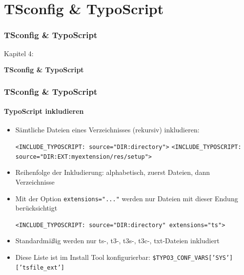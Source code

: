 %

\section{TSconfig \& TypoScript}
\begin{frame}[fragile]
	\frametitle{TSconfig \& TypoScript}

	\begin{center}\huge{Kapitel 4:}\end{center}
	\begin{center}\huge{\color{typo3darkgrey}\textbf{TSconfig \& TypoScript}}\end{center}

\end{frame}


\begin{frame}[fragile]
	\frametitle{TSconfig \& TypoScript}
	\framesubtitle{TypoScript inkludieren}

	\begin{itemize}
		\item Sämtliche Dateien eines Verzeichnisses (rekursiv) inkludieren:

			\lstinline!<INCLUDE_TYPOSCRIPT: source="DIR:directory">!
			\lstinline!<INCLUDE_TYPOSCRIPT: source="DIR:EXT:myextension/res/setup">!

		\item Reihenfolge der Inkludierung:\newline
			alphabetisch, zuerst Dateien, dann Verzeichnisse
		\item Mit der Option \texttt{extensions="..."} werden nur Dateien mit dieser Endung berücksichtigt

			\lstinline!<INCLUDE_TYPOSCRIPT: source="DIR:directory" extensions="ts">!

		\item Standardmäßig werden nur ts-, t3-, t3s-, t3c-, txt-Dateien inkludiert
		\item Diese Liste ist im Install Tool konfigurierbar:\newline
			\texttt{\$TYPO3\_CONF\_VARS['SYS']['tsfile\_ext']}
	\end{itemize}

\end{frame}

